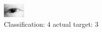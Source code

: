 \begin{figure}[h!]
\begin{center}
\includegraphics[width=0.60\columnwidth]{figures/ID47_class_4_target_3.png}
\end{center}
\caption{ Classification: 4 actual target: 3}
\label{fig:ID47_class_4_target_3}
\end{figure}
